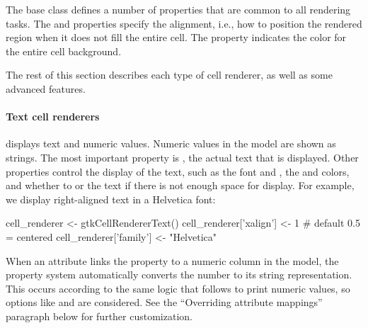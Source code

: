 The base class  defines a number of properties
that are common to all rendering tasks. The  and
 properties specify the alignment, i.e., how to position
the rendered region when it does not fill the entire cell. The
 property indicates the color for the entire
cell background.

The rest of this section describes each type of cell renderer, as well
as some advanced features.

\paragraph{Text cell renderers}

 displays text and numeric
values. Numeric values in the model are shown as strings.  The most
important property is , the actual text that is
displayed. Other properties control the display of the text, such as
the font  and , the  and
 colors, and whether to  or
 the text if there is not enough space for display.  For
example, we display right-aligned text in a Helvetica font:
\begin{Schunk}
\begin{Sinput}
 cell_renderer <- gtkCellRendererText()
 cell_renderer['xalign'] <- 1          # default 0.5 = centered
 cell_renderer['family'] <- "Helvetica"  
\end{Sinput}
\end{Schunk}

When an attribute links the  property to a numeric column
in the model, the property system automatically converts the number to
its string representation. This occurs according to the same logic
that \R\/ follows to print numeric values, so options like
 and  are considered. See the ``Overriding
attribute mappings'' paragraph below for further customization.

